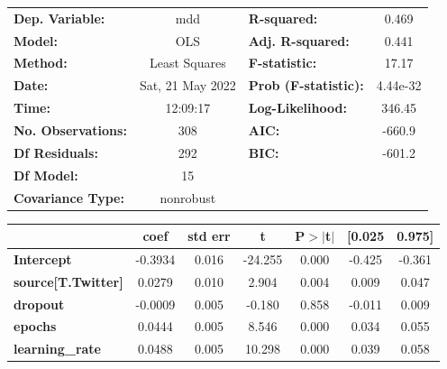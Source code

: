 \begin{center}
\begin{tabular}{lclc}
\toprule
\textbf{Dep. Variable:}              &       mdd        & \textbf{  R-squared:         } &     0.469   \\
\textbf{Model:}                      &       OLS        & \textbf{  Adj. R-squared:    } &     0.441   \\
\textbf{Method:}                     &  Least Squares   & \textbf{  F-statistic:       } &     17.17   \\
\textbf{Date:}                       & Sat, 21 May 2022 & \textbf{  Prob (F-statistic):} &  4.44e-32   \\
\textbf{Time:}                       &     12:09:17     & \textbf{  Log-Likelihood:    } &    346.45   \\
\textbf{No. Observations:}           &         308      & \textbf{  AIC:               } &    -660.9   \\
\textbf{Df Residuals:}               &         292      & \textbf{  BIC:               } &    -601.2   \\
\textbf{Df Model:}                   &          15      & \textbf{                     } &             \\
\textbf{Covariance Type:}            &    nonrobust     & \textbf{                     } &             \\
\bottomrule
\end{tabular}
\begin{tabular}{lcccccc}
                                     & \textbf{coef} & \textbf{std err} & \textbf{t} & \textbf{P$> |$t$|$} & \textbf{[0.025} & \textbf{0.975]}  \\
\midrule
\textbf{Intercept}                   &      -0.3934  &        0.016     &   -24.255  &         0.000        &       -0.425    &       -0.361     \\
\textbf{source[T.Twitter]}           &       0.0279  &        0.010     &     2.904  &         0.004        &        0.009    &        0.047     \\
\textbf{dropout}                     &      -0.0009  &        0.005     &    -0.180  &         0.858        &       -0.011    &        0.009     \\
\textbf{epochs}                      &       0.0444  &        0.005     &     8.546  &         0.000        &        0.034    &        0.055     \\
\textbf{learning\_rate}              &       0.0488  &        0.005     &    10.298  &         0.000        &        0.039    &        0.058     \\

\end{tabular}
\end{center}

